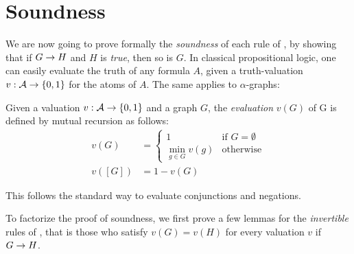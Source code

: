 \section{Soundness}

We are now going to prove formally the \emph{soundness} of each rule of
, by showing that if $G \rightarrow H$ and $H$ is \emph{true}, then so is
$G$. In classical propositional logic, one can easily evaluate the truth of any
formula $A$, given a truth-valuation $v : \mathcal{A} \to \{0,1\}$ for the atoms of
$A$. The same applies to $\alpha$-graphs:

\begin{definition}

  Given a valuation $v : \mathcal{A} \to \{0,1\}$ and a graph $G$, the
  \emph{evaluation} $v(G)$ of G is defined by mutual recursion as follows:
  \begin{align*}
    v(G) &= \begin{cases}
      1 &\text{if $G = \emptyset$} \\
      \min_{g \in G}{v(g)} &\text{otherwise}
    \end{cases} \\
    v([G]) &= 1 - v(G)
  \end{align*}
\end{definition}

This follows the standard way to evaluate conjunctions and negations.

To factorize the proof of soundness, we first prove a few lemmas for the
\emph{invertible} rules of , that is those who satisfy $v(G) = v(H)$
for every valuation $v$ if $G \rightarrow H$.

